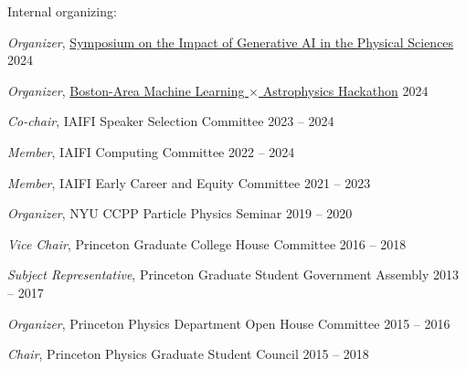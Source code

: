 \documentclass[letterpaper,11pt]{article}
\newenvironment{packed_itemize}{
\begin{itemize}[label=\raisebox{0.25ex}{\tiny$\bullet$}]
  \setlength{\itemsep}{4.0pt}
  \setlength{\parskip}{0pt}
  \setlength{\parsep}{0pt}}{\end{itemize}
}
\begin{document}
\vspace{2mm}

  \noindent
Internal organizing:
  \begin{packed_itemize}
  \item \emph{Organizer}, \href{https://iaifi.org/generative-ai-workshop}{Symposium on the Impact of Generative AI in the Physical Sciences}  \hfill 2024
  \item \emph{Organizer}, \href{https://iaifi.org/hackathon.html}{Boston-Area Machine Learning $\times$ Astrophysics Hackathon}  \hfill 2024
  \item \emph{Co-chair}, IAIFI Speaker Selection Committee  \hfill 2023 -- 2024
  \item \emph{Member}, IAIFI Computing Committee  \hfill 2022 -- 2024
  \item \emph{Member}, IAIFI Early Career and Equity Committee  \hfill 2021 -- 2023
  \item \emph{Organizer}, NYU CCPP Particle Physics Seminar \hfill 2019 -- 2020
  \item \emph{Vice Chair}, Princeton Graduate College House Committee \hfill 2016 -- 2018
  \item \emph{Subject Representative}, Princeton Graduate Student Government Assembly \hfill 2013 -- 2017
  \item \emph{Organizer}, Princeton Physics Department Open House Committee  \hfill 2015 -- 2016
  \item \emph{Chair}, Princeton Physics Graduate Student Council \hfill 2015 -- 2018
\end{packed_itemize}

\vspace{2mm}
\end{document}

